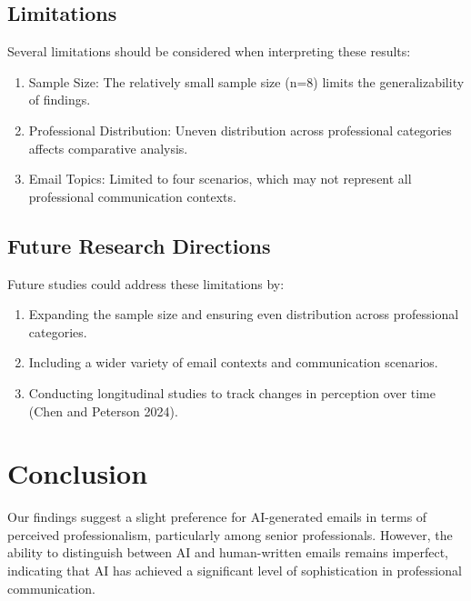 \documentclass[
  letterpaper,
  DIV=11,
  numbers=noendperiod]{scrartcl}
\providecommand{\tightlist}{%
  \setlength{\itemsep}{0pt}\setlength{\parskip}{0pt}}\usepackage{longtable,booktabs,array}
\begin{document}
\subsection{Limitations}\label{limitations}

Several limitations should be considered when interpreting these
results:

\begin{enumerate}
\def\labelenumi{\arabic{enumi}.}
\tightlist
\item
  Sample Size: The relatively small sample size (n=8) limits the
  generalizability of findings.
\item
  Professional Distribution: Uneven distribution across professional
  categories affects comparative analysis.
\item
  Email Topics: Limited to four scenarios, which may not represent all
  professional communication contexts.
\end{enumerate}

\subsection{Future Research
Directions}\label{future-research-directions}

Future studies could address these limitations by:

\begin{enumerate}
\def\labelenumi{\arabic{enumi}.}
\tightlist
\item
  Expanding the sample size and ensuring even distribution across
  professional categories.
\item
  Including a wider variety of email contexts and communication
  scenarios.
\item
  Conducting longitudinal studies to track changes in perception over
  time (Chen and Peterson 2024).
\end{enumerate}

\section{Conclusion}\label{conclusion}

Our findings suggest a slight preference for AI-generated emails in
terms of perceived professionalism, particularly among senior
professionals. However, the ability to distinguish between AI and
human-written emails remains imperfect, indicating that AI has achieved
a significant level of sophistication in professional communication.
\end{document}
